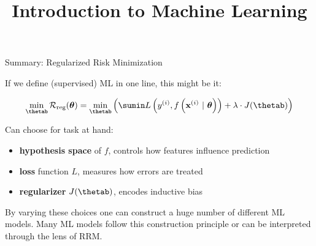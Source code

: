 \documentclass[11pt,compress,t,notes=noshow, xcolor=table]{beamer}
\title{Introduction to Machine Learning}
\begin{document}




\begin{vbframe}{Summary: Regularized Risk Minimization}

If we define (supervised) ML in one line, this might be it:

$$
\min_{\thetab} \riskrt= \min_{\thetab} \left(\sumin \Lxyit + \lambda \cdot J(\thetab) \right)
$$

Can choose for task at hand:

\begin{itemize}
  \item \textbf{hypothesis space} of $f$, controls how features influence prediction
  \item \textbf{loss} function $L$, measures how errors are treated
  \item \textbf{regularizer} $J(\thetab)$, encodes inductive 
  bias 
\end{itemize}

\vfill

By varying these choices one can construct a huge number of different ML models. 
Many ML models follow this construction principle or can be interpreted through 
the lens of RRM.

\end{vbframe}

\end{document}
